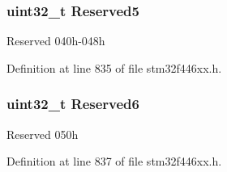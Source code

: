 \subsubsection[{\texorpdfstring{Reserved5}{Reserved5}}]{\setlength{\rightskip}{0pt plus 5cm}uint32\+\_\+t Reserved5}\hypertarget{struct_u_s_b___o_t_g___global_type_def_a764423056e148c60837b00d6dc35bb75}{}\label{struct_u_s_b___o_t_g___global_type_def_a764423056e148c60837b00d6dc35bb75}
Reserved 040h-\/048h 

Definition at line 835 of file stm32f446xx.\+h.

\subsubsection[{\texorpdfstring{Reserved6}{Reserved6}}]{\setlength{\rightskip}{0pt plus 5cm}uint32\+\_\+t Reserved6}\hypertarget{struct_u_s_b___o_t_g___global_type_def_a1442a75374a2a4ca1c3d07293c780523}{}\label{struct_u_s_b___o_t_g___global_type_def_a1442a75374a2a4ca1c3d07293c780523}
Reserved 050h 

Definition at line 837 of file stm32f446xx.\+h.



